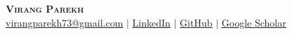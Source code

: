 \documentclass[../../resume]{subfiles}
\begin{document}
\begin{center}
    \textbf{\Huge \scshape Virang Parekh} \\ \vspace{1pt}
    \href{mailto:virangparekh73@gmail.com}{\underline{virangparekh73@gmail.com}} $|$ 
    \href{https://www.linkedin.com/in/virang-parekh/}{\underline{LinkedIn}} $|$
    \href{https://github.com/VirangParekh}{\underline{GitHub}} $|$
    \href{https://scholar.google.com/citations?user=7OuFvOQAAAAJ&hl=en&authuser=1}{\underline{Google Scholar}}
\end{center}

\end{document}
